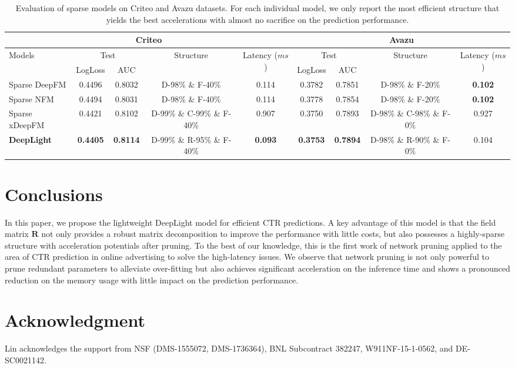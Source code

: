 \documentclass[sigconf]{acmart}
\begin{document}
\begin{table*}
 \caption{Evaluation of sparse models on Criteo and Avazu datasets. For each individual model, we only report the most efficient structure that yields the best accelerations with almost no sacrifice on the prediction performance. }
  \centering
  \small
  \begin{tabular}{lcccc|cccc}
    \toprule
    \multicolumn{5}{c|}{Criteo} & \multicolumn{4}{c}{Avazu} \\  
    \midrule
    \multirow{2}{*}{Models}    & \multicolumn{2}{c}{Test} & \multirow{2}{*}{Structure}  & \multirow{2}{*}{Latency ($ms$)} & \multicolumn{2}{c}{Test} & \multirow{2}{*}{Structure} & \multirow{2}{*}{Latency ($ms$)}  \\
      & LogLoss   & AUC &  & & LogLoss & AUC & \\
    \midrule
    Sparse DeepFM    & 0.4496 & 0.8032 &  D-98\% \& F-40\% & 0.114 & 0.3782  & 0.7851 & D-98\% \& F-20\% & \textbf{0.102}  \\
    Sparse NFM        &   0.4494 & 0.8031  & D-98\% \& F-40\% & 0.114  & 0.3778  & 0.7854 & D-98\% \& F-20\%  & \textbf{0.102}    \\
    Sparse xDeepFM     & 0.4421 & 0.8102 & \small{D-99\% \& C-99\% \& F-40\%}  &  0.907 & 0.3750  & 0.7893  &  \small{D-98\% \& C-98\% \& F-0\%} & 0.927   \\
    \midrule
    \textbf{DeepLight}    & \textbf{0.4405} & \textbf{0.8114}  & \small{D-99\% \& R-95\% \& F-40\%}  &  \textbf{0.093} & \textbf{0.3753} & \textbf{0.7894}  & \small{D-98\% \& R-90\% \& F-0\%} & 0.104  \\
    \bottomrule
  \end{tabular}
  \vspace{-0.5em}
  \label{sparse_criteo_data}
\end{table*}

\section{Conclusions}

In this paper, we propose the lightweight DeepLight model for efficient CTR predictions. A key advantage of this model is that the field matrix $\bm{R}$ not only provides a robust matrix decomposition to improve the performance with little costs, but also possesses a highly-sparse structure with acceleration potentials after pruning. To the best of our knowledge, this is the first work of network pruning applied to the area of CTR prediction in online advertising to solve the high-latency issues. We observe that network pruning is not only powerful to prune redundant parameters to alleviate over-fitting but also achieves significant acceleration on the inference time and shows a pronounced reduction on the memory usage with little impact on the prediction performance. 

\section*{Acknowledgment} 
Lin acknowledges the support from NSF (DMS-1555072, DMS-1736364), BNL Subcontract 382247, W911NF-15-1-0562, and DE-SC0021142.



\end{document}
